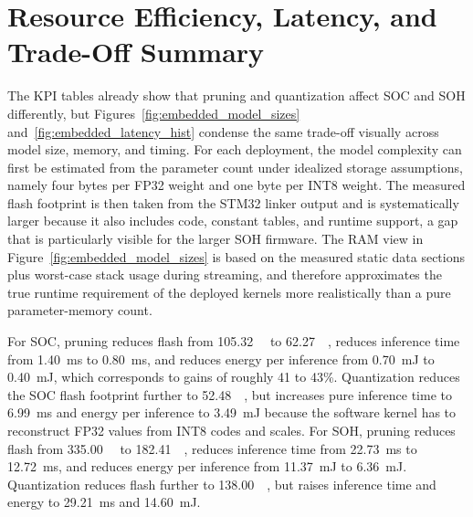 \documentclass[
    a4paper,
    12pt,
    titlepage,
    bibliography=totoc,
    twoside=on,
    parskip=false,
    numbers=noenddot,
    cleardoublepage=empty,
    DIV=12,
    BCOR=12.0mm,
    headheight=36pt,
    headings=openright
]{scrreprt}
\begin{document}
\section{Resource Efficiency, Latency, and Trade-Off Summary}
The KPI tables already show that pruning and quantization affect SOC and SOH differently, but Figures~\ref{fig:embedded_model_sizes} and~\ref{fig:embedded_latency_hist} condense the same trade-off visually across model size, memory, and timing. For each deployment, the model complexity can first be estimated from the parameter count under idealized storage assumptions, namely four bytes per FP32 weight and one byte per INT8 weight. The measured flash footprint is then taken from the STM32 linker output and is systematically larger because it also includes code, constant tables, and runtime support, a gap that is particularly visible for the larger SOH firmware. The RAM view in Figure~\ref{fig:embedded_model_sizes} is based on the measured static data sections plus worst-case stack usage during streaming, and therefore approximates the true runtime requirement of the deployed kernels more realistically than a pure parameter-memory count.

For SOC, pruning reduces flash from \SI{105.32}{\kilo\byte} to \SI{62.27}{\kilo\byte}, reduces inference time from \SI{1.40}{\milli\second} to \SI{0.80}{\milli\second}, and reduces energy per inference from \SI{0.70}{\milli\joule} to \SI{0.40}{\milli\joule}, which corresponds to gains of roughly 41 to 43\%. Quantization reduces the SOC flash footprint further to \SI{52.48}{\kilo\byte}, but increases pure inference time to \SI{6.99}{\milli\second} and energy per inference to \SI{3.49}{\milli\joule} because the software kernel has to reconstruct FP32 values from INT8 codes and scales. For SOH, pruning reduces flash from \SI{335.00}{\kilo\byte} to \SI{182.41}{\kilo\byte}, reduces inference time from \SI{22.73}{\milli\second} to \SI{12.72}{\milli\second}, and reduces energy per inference from \SI{11.37}{\milli\joule} to \SI{6.36}{\milli\joule}. Quantization reduces flash further to \SI{138.00}{\kilo\byte}, but raises inference time and energy to \SI{29.21}{\milli\second} and \SI{14.60}{\milli\joule}.
\end{document}
